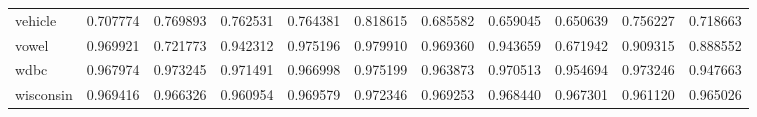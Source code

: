 \begin{tabular}{lrrrrrrrrrr}
vehicle         &   0.707774 &  0.769893 &  0.762531 &  0.764381 &  0.818615 &  0.685582 &  0.659045 &  0.650639 &  0.756227 &  0.718663 \\
vowel           &   0.969921 &  0.721773 &  0.942312 &  0.975196 &  0.979910 &  0.969360 &  0.943659 &  0.671942 &  0.909315 &  0.888552 \\
wdbc            &   0.967974 &  0.973245 &  0.971491 &  0.966998 &  0.975199 &  0.963873 &  0.970513 &  0.954694 &  0.973246 &  0.947663 \\
wisconsin       &   0.969416 &  0.966326 &  0.960954 &  0.969579 &  0.972346 &  0.969253 &  0.968440 &  0.967301 &  0.961120 &  0.965026 \\
\bottomrule
\end{tabular}
